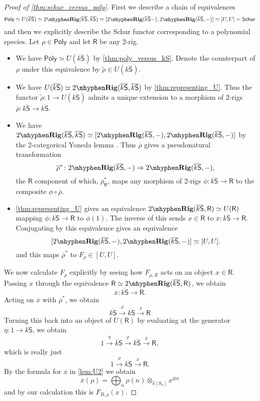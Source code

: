 \documentclass[12pt,reqno]{amsart}
\theoremstyle{plain}
\theoremstyle{definition}
\theoremstyle{remark}
\newcommand{\maps}{\colon}
\newcommand{\To}{\Rightarrow}
\newcommand{\category}[1]{\mathsf{#1}}
\newcommand{\R}{\category R}
\renewcommand{\S}{\category S}
\newcommand{\namedcat}[1]{\mathsf{#1}}
\newcommand{\Poly}{\namedcat{Poly}}
\newcommand{\Schur}{\namedcat{Schur}}
\newcommand{\TRig}{2\mhyphen\namedbicat{Rig}}
\newcommand{\namedbicat}[1]{\mathbf{#1}}
\newcommand{\ksbar}{\overline{k\S}}
\numberwithin{thm}{section}
\begin{document}
\begin{proof}[Proof of \cref{thm:schur_versus_poly}]
    First we describe a chain of equivalences
     \[ 
        \Poly 
        \simeq U(\ksbar) 
        \simeq \TRig(\ksbar, \ksbar) 
        \simeq [\TRig(\ksbar -), \TRig(\ksbar, -)]  
        \simeq [U, U]= \Schur   
    \]
    and then we explicitly describe the Schur functor corresponding to a polynomial species. Let $\rho \in \Poly$ and let $\R$ be any 2-rig. 
    
    \begin{itemize}
        \item We have $\Poly \simeq U(\ksbar)$ by \cref{thm:poly_versus_kS}. Denote the counterpart of $\rho$ under this equivalence by $\widetilde \rho \in U(\ksbar)$. 
        \item     
        We have $U(\ksbar) \simeq \TRig(\ksbar, \ksbar)$ by \cref{thm:representing_U}. Thus the functor $\widetilde \rho \maps 1 \to U(\ksbar)$ admits a unique extension to a morphism of 2-rigs $\overline \rho \maps \ksbar \to \ksbar$.
        \item 
        We have $\TRig(\ksbar, \ksbar) \simeq [\TRig(\ksbar, -), \TRig(\ksbar, -) ]$ by the 2-categorical Yoneda lemma \cite[Ch.\ 8]{2DCats}. Thus  $\overline\rho$ gives a pseudonatural transformation 
        \[
            \overline \rho^* \maps \TRig(\ksbar, -) \To \TRig(\ksbar, -), 
        \]
        the $\R$ component of which, $\overline \rho_\R^*$, maps any morphism of 2-rigs $\phi \maps \ksbar \to \R$ to the composite $\phi \circ \overline \rho$.
        \item     
        \cref{thm:representing_U} gives an equivalence $\TRig(\ksbar, \R) \simeq U(\R)$ mapping $\phi \maps \ksbar \to \R$ to $\phi(1)$. The inverse of this sends $x \in \R$ to $\overline x \maps \ksbar \to \R$. Conjugating by this equivalence gives an equivalence
        \[
            [\TRig(\ksbar, -), \TRig(\ksbar, -) ] \simeq [U, U].
        \]
        and this maps $\overline{\rho}^\ast$ to $F_\rho \in [U, U]$.
    \end{itemize}
   
    We now calculate $F_\rho$ explicitly by seeing how $F_{\rho, R}$ acts on an object $x \in \R$. Passing $x$ through the equivalence $\R \simeq \TRig(\ksbar, \R)$, we obtain
    \[
        \overline x \maps \ksbar \to \R.
    \] 
    Acting on $\overline x$ with $\overline \rho^*$, we obtain
    \[
        \ksbar \xrightarrow{\overline \rho} \ksbar \xrightarrow{\overline x} \R
    \] 
    Turning this back into an object of $U(\R)$ by evaluating at the generator $\eta \maps 1 \to \ksbar$, we obtain
    \[
        1 \xrightarrow{\eta} \ksbar \xrightarrow{\overline \rho} \ksbar \xrightarrow{\overline x} \R, 
    \]
    which is really just
    \[
        1 \xrightarrow{\rho} \ksbar \xrightarrow{\overline x} \R.
    \]
    By the formula for $\overline{x}$ in \cref{lem:U2} we obtain
    \[ 
        \overline x (\rho) = \bigoplus_n \rho(n) \otimes_{k[S_n]} x^{\otimes n}
    \] 
    and by our calculation this is $F_{R, \rho}(x)$.
\end{proof}
\end{document}
